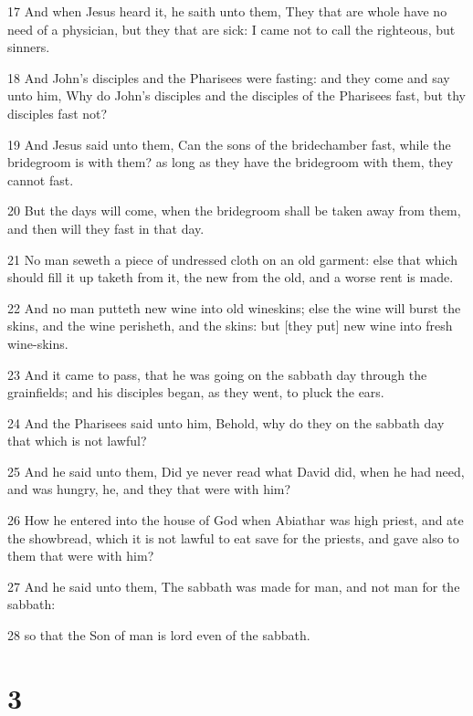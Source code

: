 \par 17 And when Jesus heard it, he saith unto them, They that are whole have no need of a physician, but they that are sick: I came not to call the righteous, but sinners.
\par 18 And John's disciples and the Pharisees were fasting: and they come and say unto him, Why do John's disciples and the disciples of the Pharisees fast, but thy disciples fast not?
\par 19 And Jesus said unto them, Can the sons of the bridechamber fast, while the bridegroom is with them? as long as they have the bridegroom with them, they cannot fast.
\par 20 But the days will come, when the bridegroom shall be taken away from them, and then will they fast in that day.
\par 21 No man seweth a piece of undressed cloth on an old garment: else that which should fill it up taketh from it, the new from the old, and a worse rent is made.
\par 22 And no man putteth new wine into old wineskins; else the wine will burst the skins, and the wine perisheth, and the skins: but [they put] new wine into fresh wine-skins.
\par 23 And it came to pass, that he was going on the sabbath day through the grainfields; and his disciples began, as they went, to pluck the ears.
\par 24 And the Pharisees said unto him, Behold, why do they on the sabbath day that which is not lawful?
\par 25 And he said unto them, Did ye never read what David did, when he had need, and was hungry, he, and they that were with him?
\par 26 How he entered into the house of God when Abiathar was high priest, and ate the showbread, which it is not lawful to eat save for the priests, and gave also to them that were with him?
\par 27 And he said unto them, The sabbath was made for man, and not man for the sabbath:
\par 28 so that the Son of man is lord even of the sabbath.

\chapter{3}


